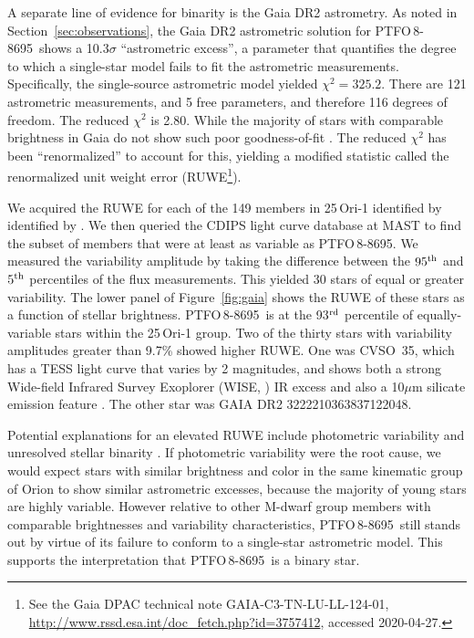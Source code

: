 \documentclass[12pt,twocolumn,tighten,trackchanges]{aastex62}
\newcommand{\ptfo}{PTFO$\,$8-8695}
\begin{document}
A separate line of evidence for binarity is the Gaia DR2 astrometry.
As noted in Section~\ref{sec:observations}, the Gaia DR2 astrometric
solution for \ptfo\ shows a 10.3$\sigma$ ``astrometric excess'', a
parameter that quantifies the degree to which a single-star model
fails to fit the astrometric measurements.  Specifically, the
single-source astrometric model yielded $\chi^2=325.2$.  There are 121
astrometric measurements, and 5 free parameters, and therefore 116
degrees of freedom. The reduced $\chi^2$ is 2.80.  While the majority
of stars with comparable brightness in Gaia do not show such poor
goodness-of-fit \citep[see][Appendix
A]{lindegren_gaiasoln_2018}.  The reduced $\chi^2$ has been
``renormalized'' to account for this, yielding a modified statistic
called the renormalized unit weight error (RUWE\footnote{ See the Gaia
DPAC technical note GAIA-C3-TN-LU-LL-124-01,
\url{http://www.rssd.esa.int/doc_fetch.php?id=3757412}, accessed
2020-04-27. }).

We acquired the RUWE for each of the 149 members in 25$\,$Ori-1
identified by identified by \citet{kounkel_apogee2_2018}.  We then
queried the CDIPS light curve database at MAST
\citep{bouma_cluster_2019} to find the subset of members that were at
least as variable as \ptfo.  We measured the variability amplitude by
taking the difference between the $95^{\rm th}$ and $5^{\rm th}$
percentiles of the flux measurements.  This yielded 30 stars of equal
or greater variability.  The lower panel of Figure~\ref{fig:gaia}
shows the RUWE of these stars as a function of stellar brightness.
\ptfo\ is at the 93$^{\rm rd}$ percentile of equally-variable stars
within the 25$\,$Ori-1 group.  Two of the thirty stars with
variability amplitudes greater than 9.7\% showed higher RUWE.  One was
CVSO~35, which has a TESS light curve that varies by 2 magnitudes, and
shows both a strong Wide-field Infrared Survey Exoplorer (WISE,
\citealt{wright_WISE_2010}) IR excess and also a 10$\mu$m silicate
emission feature \citep{mauco_herschel_2018}.  The other star was GAIA
DR2 3222210363837122048.

Potential explanations for an elevated RUWE include photometric
variability and unresolved stellar binarity \citep[{\it
e.g.},][]{rizzuto_ZEIT8_2018,belokurov_unresolved_2020}.  If
photometric variability were the root cause, we would expect stars
with similar brightness and color in the same kinematic group of Orion
to show similar astrometric excesses, because the majority of young
stars are highly variable.  However relative to other M-dwarf group
members with comparable brightnesses and variability characteristics,
\ptfo\ still stands out by virtue of its failure to conform to a
single-star astrometric model. This supports the interpretation that
\ptfo\ is a binary star.
\end{document}
